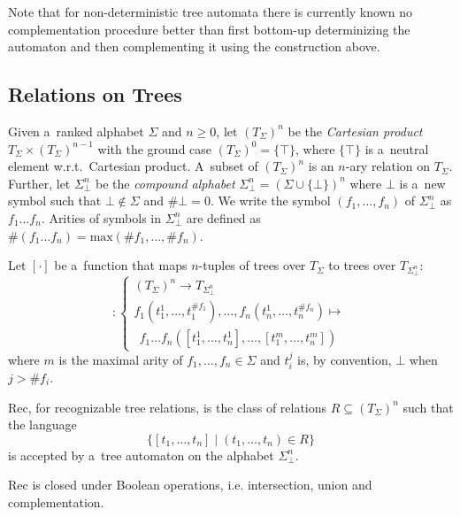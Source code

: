 Note that for non-deterministic tree automata there is currently known no
complementation procedure better than first bottom-up determinizing the
automaton and then complementing it using the construction above.

 \subsection{Relations on Trees}

Given a~ranked alphabet $\Sigma$ and $n \geq 0$, let $(T_\Sigma)^n$ be the
\emph{Cartesian product} $T_\Sigma \times (T_\Sigma)^{n-1}$ with the ground case
$(T_\Sigma)^0 = \{\top\}$, where $\{\top\}$ is a~neutral element w.r.t.\ 
Cartesian product. A~subset of $(T_\Sigma)^n$ is an $n$-ary relation on
$T_\Sigma$. Further, let $\Sigma^n_\bot$ be the \emph{compound alphabet}
$\Sigma_\bot^n = (\Sigma \cup \{\bot\})^n$ where $\bot$ is a~new symbol such
that $\bot \notin \Sigma$ and $\#\bot = 0$. We write the symbol
$(f_1,\ldots,f_n)$ of $\Sigma_\bot^n$ as $f_1\ldots f_n$. Arities of symbols in
$\Sigma_\bot^n$ are defined as $\#(f_1\ldots f_n) =
\text{max}(\#f_1,\ldots,\#f_n)$.

Let $[\cdot]$ be a~function that maps $n$-tuples of trees over $T_\Sigma$ to
trees over $T_{\Sigma_\bot^n}$:
\begin{equation}
    [\cdot] :
    \begin{cases}
     (T_\Sigma)^n \rightarrow T_{\Sigma^n_\bot}\\
		 f_1(t_1^1,\ldots,t^{\#f_1}_1),\ldots,f_n(t_n^1,\ldots,t^{\#f_n}_n) \mapsto\\
		 \ \ f_1\ldots f_n([t_1^1,\ldots,t_n^1],\ldots,[t_1^m,\ldots,t_n^m])
   \end{cases}
\end{equation}
 where $m$ is the maximal arity of $f_1,\ldots,f_n \in \Sigma$ and $t_i^j$ is,
 by convention, $\bot$ when $j > \#f_i$.

\begin{defz}
Rec, for recognizable tree relations, is the class of relations $R \subseteq
(T_\Sigma)^n$ such that the language 
\begin{equation}
\{[t_1,\ldots,t_n] \mid (t_1,\ldots,t_n)
\in R\}
\end{equation} is accepted by a~tree automaton on the alphabet $\Sigma_\bot^n$.
\end{defz}

\begin{prop}
Rec is closed under Boolean operations, i.e. intersection, union and
complementation.
\end{prop}

